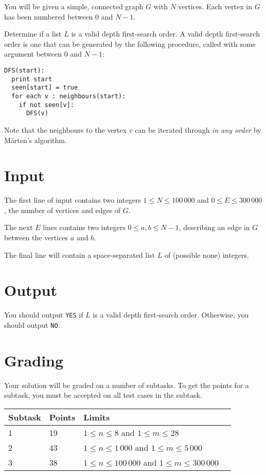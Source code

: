 You will be given a simple, connected graph $G$ with $N$ vertices. Each vertex in $G$ has been numbered between $0$ and $N - 1$.

Determine if a list $L$ is a valid depth first-search order. A valid depth first-search order is one that can be generated by the following procedure, called with some argument between $0$ and $N - 1$:

\begin{verbatim}
DFS(start):
  print start
  seen[start] = true
  for each v : neighbours(start):
    if not seen[v]:
      DFS(v)
\end{verbatim}

Note that the neighbours to the vertex $v$ can be iterated through \emph{in any order} by Mårten's algorithm.

\section*{Input}
The first line of input contains two integers $1 \le N \le 100\,000$ and $0 \le E \le 300\,000$, the number of vertices and edges of $G$.

The next $E$ lines contains two integers $0 \le a, b \le N - 1$, describing an edge in $G$ between the vertices $a$ and $b$.

The final line will contain a space-separated list $L$ of (possible none) integers.

\section*{Output}
You should output \texttt{YES} if $L$ is a valid depth first-search order. Otherwise, you should output \texttt{NO}.

\section*{Grading}
Your solution will be graded on a number of subtasks. To get the points for a subtask, you must
be accepted on all test cases in the subtask.

\begin{tabular}{| l | l | l | l |}
    \hline
    Subtask & Points & Limits    \\ \hline
    1     & 19         & $1 \le n \le 8$ and $1 \le m \le 28$ \\ \hline
    2     & 43         & $1 \le n \le 1\,000$ and $1 \le m \le 5\,000$ \\ \hline
    3     & 38         & $1 \le n \le 100\,000$ and $1 \le m \le 300\,000$ \\ \hline
\end{tabular}

